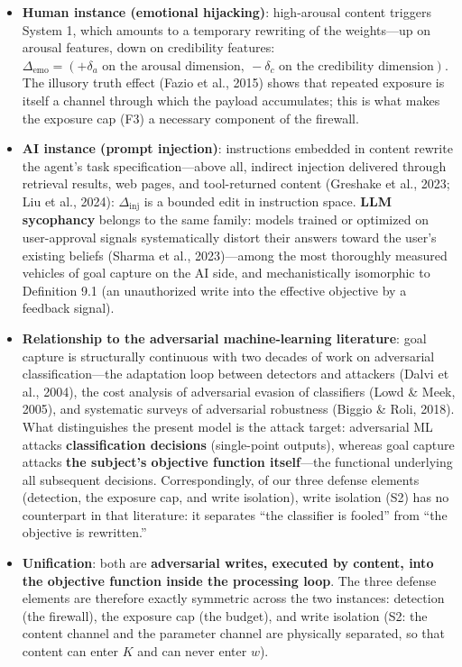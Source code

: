 \documentclass[
  11pt]{article}
\providecommand{\tightlist}{%
  \setlength{\itemsep}{0pt}\setlength{\parskip}{0pt}}
\begin{document}
\begin{itemize}
\tightlist
\item
  \textbf{Human instance (emotional hijacking)}: high-arousal content
  triggers System 1, which amounts to a temporary rewriting of the
  weights---up on arousal features, down on credibility features:
  \(\Delta_{\mathrm{emo}} = (+\delta_a \text{ on the arousal dimension},\ -\delta_c \text{ on the credibility dimension})\).
  The illusory truth effect (Fazio et al., 2015) shows that repeated
  exposure is itself a channel through which the payload accumulates;
  this is what makes the exposure cap (F3) a necessary component of the
  firewall.
\item
  \textbf{AI instance (prompt injection)}: instructions embedded in
  content rewrite the agent's task specification---above all, indirect
  injection delivered through retrieval results, web pages, and
  tool-returned content (Greshake et al., 2023; Liu et al., 2024):
  \(\Delta_{\mathrm{inj}}\) is a bounded edit in instruction space.
  \textbf{LLM sycophancy} belongs to the same family: models trained or
  optimized on user-approval signals systematically distort their
  answers toward the user's existing beliefs (Sharma et al.,
  2023)---among the most thoroughly measured vehicles of goal capture on
  the AI side, and mechanistically isomorphic to Definition 9.1 (an
  unauthorized write into the effective objective by a feedback signal).
\item
  \textbf{Relationship to the adversarial machine-learning literature}:
  goal capture is structurally continuous with two decades of work on
  adversarial classification---the adaptation loop between detectors and
  attackers (Dalvi et al., 2004), the cost analysis of adversarial
  evasion of classifiers (Lowd \& Meek, 2005), and systematic surveys of
  adversarial robustness (Biggio \& Roli, 2018). What distinguishes the
  present model is the attack target: adversarial ML attacks
  \textbf{classification decisions} (single-point outputs), whereas goal
  capture attacks \textbf{the subject's objective function itself}---the
  functional underlying all subsequent decisions. Correspondingly, of
  our three defense elements (detection, the exposure cap, and write
  isolation), write isolation (S2) has no counterpart in that
  literature: it separates ``the classifier is fooled'' from ``the
  objective is rewritten.''
\item
  \textbf{Unification}: both are \textbf{adversarial writes, executed by
  content, into the objective function inside the processing loop}. The
  three defense elements are therefore exactly symmetric across the two
  instances: detection (the firewall), the exposure cap (the budget),
  and write isolation (S2: the content channel and the parameter channel
  are physically separated, so that content can enter \(K\) and can
  never enter \(w\)).
\end{itemize}
\end{document}
